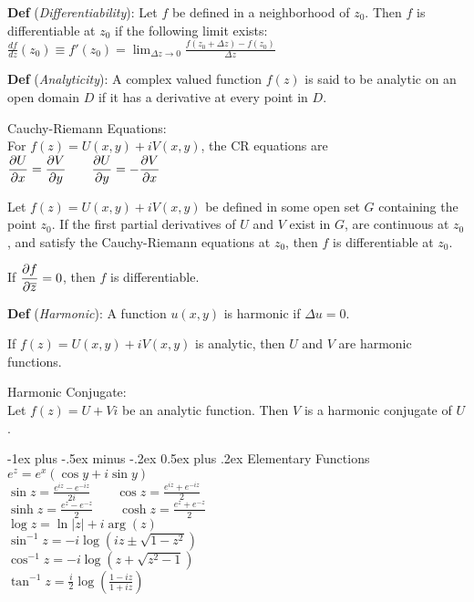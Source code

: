 \documentclass[12pt,landscape]{article}
\makeatletter
\renewcommand{\section}{\@startsection{section}{1}{0mm}%
                                {-1ex plus -.5ex minus -.2ex}%
                                {0.5ex plus .2ex}%
                                {\normalfont\normalsize\bfseries}}
\newcommand{\tab}{\hspace{.02\textwidth}}
\newcommand{\ds}{\displaystyle}
\newcommand{\conj}[1]{\overline{#1}}
\newcommand{\defn}[1]{\textbf{Def} (\emph{#1})}
\renewcommand{\dv}[2]{\frac{d#1}{d#2}}
\theoremstyle{definition}
\makeatother
\begin{document}
\begin{multicols}{3}
\defn{Differentiability}: Let $f$ be defined in a neighborhood of $z_0$. Then $f$ is differentiable at $z_0$ if the following limit exists:\\
\tab $\ds \dv{f}{z}(z_0) \equiv f'(z_0) = \lim_{\Delta z\rightarrow 0} \frac{f(z_0 + \Delta z) - f(z_0)}{\Delta z}$ 

\defn{Analyticity}: A complex valued function $f(z)$ is said to be analytic on an open domain $D$ if it has a derivative at every point in $D$.

Cauchy-Riemann Equations:\\
For $f(z) = U(x,y) + iV(x,y)$, the CR equations are\\
\tab $\ds \pdv{U}{x} =\pdv{V}{y} \qquad \pdv{U}{y} = -\pdv{V}{x}$

\begin{theorem}
	Let $f(z) = U(x,y) + iV(x,y)$ be defined in some open set $G$ containing the point $z_0$. If the first partial derivatives of $U$ and $V$ exist in $G$, are continuous at $z_0$, and satisfy the Cauchy-Riemann equations at $z_0$, then $f$ is differentiable at $z_0$.
\end{theorem}

\begin{theorem}
	If $\ds \pdv{f}{\conj{z}} = 0$, then $f$ is differentiable.
\end{theorem}

\defn{Harmonic}: A function $u(x,y)$ is harmonic if $\Delta{u} = 0$.

\begin{theorem}
	If $f(z) = U(x,y) + iV(x,y)$ is analytic, then $U$ and $V$ are harmonic functions.
\end{theorem}

Harmonic Conjugate:\\
\tab Let $f(z) = U + Vi$ be an analytic function. Then $V$ is a harmonic conjugate of $U$.

\section{Elementary Functions}
\tab $e^z = e^x(\cos y + i\sin y)$\\
\tab $\ds \sin z = \frac{e^{iz} - e^{-iz}}{2i} \qquad \cos z = \frac{e^{iz} + e^{-iz}}{2}$\\
\tab $\ds \sinh z = \frac{e^{z} - e^{-z}}{2} \qquad \cosh z = \frac{e^{z} + e^{-z}}{2}$\\
\tab $\log z = \ln|z| + i\arg(z)$\\
\tab $\sin^{-1}z = 	-i\log(iz \pm \sqrt{1-z^2})$\\
\tab $\cos^{-1}z = -i\log(z + \sqrt{z^2-1})$\\
\tab $\ds \tan^{-1}z = \frac{i}{2}\log\left(\frac{1-iz}{1+iz}\right)$


\end{multicols}
\end{document}
